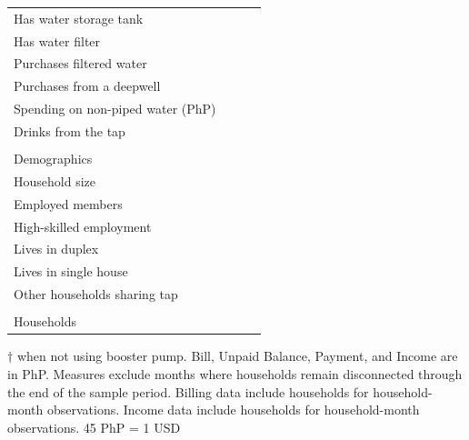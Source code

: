 \documentclass[12pt,table]{article}
\begin{document}
\begin{table}[h!]
\begin{threeparttable}
\begin{tabular}{@{}l*{1}{KKK}@{}}
\hspace{1em}Has water storage tank &  \\
\hspace{1em}Has water filter &  \\
\hspace{1em}Purchases filtered water &  \\
\hspace{1em}Purchases from a deepwell &  \\
\hspace{1em}Spending on non-piped water (PhP) &  \\
\hspace{1em}Drinks from the tap &  \\
\\[-.5em]
Demographics \\[.5em]
\hspace{1em}Household size &  \\
\hspace{1em}Employed members &  \\
\hspace{1em}High-skilled employment &  \\
\hspace{1em}Lives in duplex&  \\
\hspace{1em}Lives in single house&  \\
\hspace{1em}Other households sharing tap&  \\
\\[-.5em]
Households &  \\
\bottomrule
\end{tabular}
\begin{tablenotes}
\footnotesize
\item  $\dagger$ when not using booster pump.  Bill, Unpaid Balance, Payment, and Income are in PhP.  Measures exclude months where households remain disconnected through the end of the sample period.  Billing data include households for household-month observations.  Income data include households for household-month observations.  45 PhP = 1 USD \,\,
\end{tablenotes}
\end{threeparttable}
\end{table}
\end{document}
